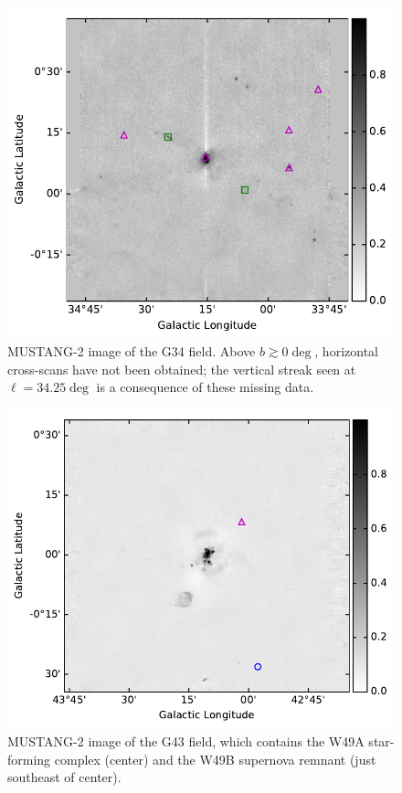\documentclass[twocolumn]{aastex62}
\newcommand{\MUSTANG}{MUSTANG-2\xspace}
\begin{document}
\begin{figure}[htp]
\includegraphics[width=17cm]{figures/G34_overview_withcatalog.pdf}
\caption{\MUSTANG image of the G34 field.  Above $b\gtrsim 0\deg$,
horizontal cross-scans have not been obtained; the vertical streak seen
at $\ell=34.25\deg$ is a consequence of these missing data.}
\label{fig:g34overview}
\end{figure}

\begin{figure}[htp]
\includegraphics[width=17cm]{figures/G43_overview_withcatalog.pdf}
\caption{\MUSTANG image of the G43 field, which contains the 
W49A star-forming complex (center) and the W49B supernova remnant (just southeast
of center).}
\label{fig:g43overview}
\end{figure}
\end{document}
